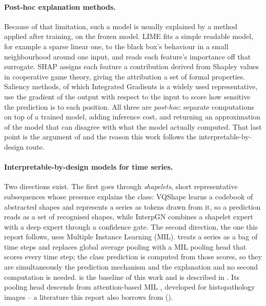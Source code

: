 \paragraph{Post-hoc explanation methods.}
Because of that limitation, such a model is usually explained by a method applied after training,
on the frozen model. LIME \citep{ribeiro2016lime} fits a simple readable model, for example a sparse
linear one, to the black box's behaviour in a small neighbourhood around one input, and reads each
feature's importance off that surrogate. SHAP \citep{lundberg2017shap} assigns each feature a
contribution derived from Shapley values in cooperative game theory, giving the attribution a set of
formal properties. Saliency methods, of which Integrated Gradients \citep{sundararajan2017ig} is a
widely used representative, use the gradient of the output with respect to the input to score how
sensitive the prediction is to each position. All three are \emph{post-hoc}: separate computations
on top of a trained model, adding inference cost, and returning an approximation of the model that
can disagree with what the model actually computed. That last point is the argument of
\citet{rudin2019stop} and the reason this work follows the interpretable-by-design route.

\paragraph{Interpretable-by-design models for time series.}
Two directions exist. The first goes through \emph{shapelets}, short representative subsequences
whose presence explains the class: VQShape \citep{wen2024vqshape} learns a codebook of abstracted
shapes and represents a series as tokens drawn from it, so a prediction reads as a set of recognised
shapes, while InterpGN \citep{wen2025interpgn} combines a shapelet expert with a deep expert through
a confidence gate. The second direction, the one this report follows, uses Multiple Instance
Learning (MIL). \millet{} \citep{early2024millet} treats a series as a bag of time steps and replaces
global average pooling with a MIL pooling head that scores every time step; the class prediction is
computed from those scores, so they are simultaneously the prediction mechanism and the explanation
and no second computation is needed. \millet{} is the baseline of this work and is described in
. Its pooling head descends from attention-based MIL \citep{ilse2018attention},
developed for histopathology images -- a literature this report also borrows from
().

